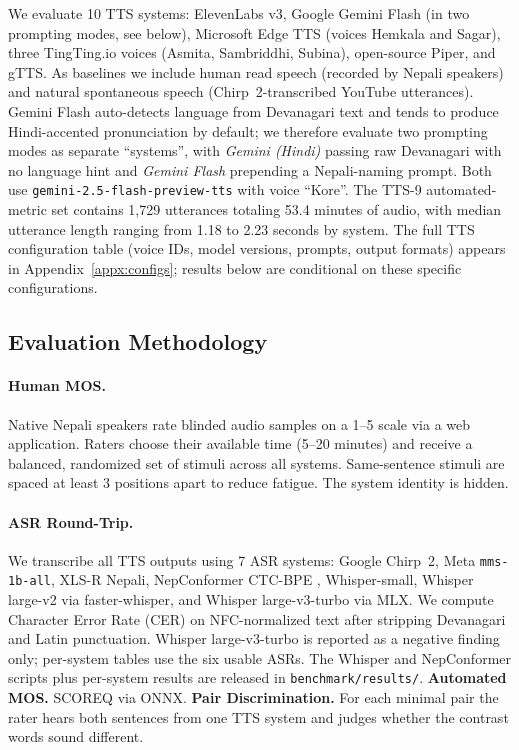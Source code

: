 \documentclass[11pt]{article}
\begin{document}
We evaluate 10 TTS systems: ElevenLabs v3, Google Gemini Flash (in two prompting modes, see below), Microsoft Edge TTS (voices Hemkala and Sagar), three TingTing.io voices (Asmita, Sambriddhi, Subina), open-source Piper, and gTTS. As baselines we include human read speech (recorded by Nepali speakers) and natural spontaneous speech (Chirp~2-transcribed YouTube utterances). Gemini Flash auto-detects language from Devanagari text and tends to produce Hindi-accented pronunciation by default; we therefore evaluate two prompting modes as separate ``systems'', with \emph{Gemini (Hindi)} passing raw Devanagari with no language hint and \emph{Gemini Flash} prepending a Nepali-naming prompt. Both use \texttt{gemini-2.5-flash-preview-tts} with voice ``Kore''. The TTS-9 automated-metric set contains 1{,}729 utterances totaling 53.4 minutes of audio, with median utterance length ranging from 1.18 to 2.23 seconds by system. The full TTS configuration table (voice IDs, model versions, prompts, output formats) appears in Appendix~\ref{appx:configs}; results below are conditional on these specific configurations.


\subsection{Evaluation Methodology}

\paragraph{Human MOS.} Native Nepali speakers rate blinded audio samples on a 1--5 scale via a web application. Raters choose their available time (5--20 minutes) and receive a balanced, randomized set of stimuli across all systems. Same-sentence stimuli are spaced at least 3 positions apart to reduce fatigue. The system identity is hidden.

\paragraph{ASR Round-Trip.} We transcribe all TTS outputs using 7 ASR systems: Google Chirp~2, Meta \texttt{mms-1b-all}, XLS-R Nepali, NepConformer CTC-BPE \citep{poudel2026nepconformer}, Whisper-small, Whisper large-v2 via faster-whisper, and Whisper large-v3-turbo via MLX. We compute Character Error Rate (CER) on NFC-normalized text after stripping Devanagari and Latin punctuation. Whisper large-v3-turbo is reported as a negative finding only; per-system tables use the six usable ASRs. The Whisper and NepConformer scripts plus per-system results are released in \texttt{benchmark/results/}. \textbf{Automated MOS.} SCOREQ \citep{ragano2024scoreq} via ONNX. \textbf{Pair Discrimination.} For each minimal pair the rater hears both sentences from one TTS system and judges whether the contrast words sound different.
\end{document}
